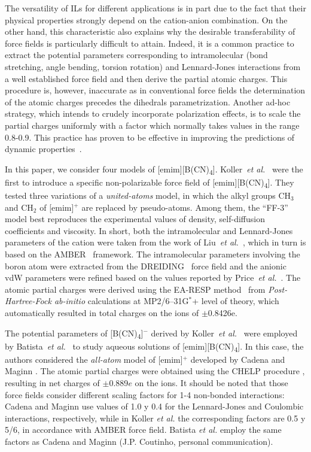 \documentclass[3p,twocolumn]{elsarticle}
\begin{document}
The versatility of ILs for different applications is in part due to the fact that their physical properties strongly depend on the cation-anion combination. On the other hand, this characteristic also explains why the desirable transferability of force fields is particularly difficult to attain. Indeed, it is a common practice to extract the potential parameters corresponding to intramolecular (bond stretching, angle bending, torsion rotation) and Lennard-Jones interactions from a well established force field and then derive the partial atomic charges. This procedure is, however, inaccurate as in conventional force fields the determination of the atomic charges precedes the dihedrals parametrization. Another ad-hoc strategy, which intends to crudely incorporate polarization effects, is to scale the partial charges uniformly with a factor which normally takes values in the range 0.8-0.9. This practice has proven to be effective in improving the predictions of dynamic properties~\cite{Schr_der_2012}.

In this paper, we consider four models of [emim][B(CN)\textsubscript{4}]. Koller~\textit{et al.}~\cite{Koller_2012} were the first to introduce a specific non-polarizable force field of [emim][B(CN)\textsubscript{4}]. They tested three variations of a \textit{united-atoms} model, in which the alkyl groups $\text{CH}_3$ and $\text{CH}_2$ of [emim]$^{+}$ are replaced by pseudo-atoms. Among them, the ``FF-3'' model best reproduces the experimental values of density, self-diffusion coefficients and viscosity. In short, both the intramolecular and Lennard-Jones parameters of the cation were taken from the work of Liu~\textit{et al.}~\cite{Liu_2006}, which in turn is based on the AMBER~\cite{Cornell_1995} framework. The intramolecular parameters involving the boron atom were extracted from the DREIDING~\cite{Mayo_1990} force field and the anionic vdW parameters were refined based on the values reported by Price~\textit{et al.}~\cite{Price_2001}. The atomic partial charges were derived using the EA-RESP method~\cite{Basma_2001} from \textit{Post-Hartree-Fock ab-initio} calculations at MP2/6–31G$^\ast$+ level of theory, which automatically resulted in total charges on the ions of $\pm$0.8426e. 

The potential parameters of [B(CN)\textsubscript{4}]$^{-}$ derived by Koller~\textit{et al.}~\cite{Koller_2012} were employed by Batista~\textit{et al.}~\cite{Batista_2015} to study aqueous solutions of [emim][B(CN)\textsubscript{4}]. In this case,  the authors considered the \textit{all-atom} model of [emim]$^{+}$ developed by Cadena and Maginn \cite{Cadena_2006}. The atomic partial charges were obtained using the CHELP procedure \cite{Breneman_1990}, resulting in net charges of $\pm$0.889$e$ on the ions. It should be noted that those force fields consider different scaling factors for 1-4 non-bonded interactions: Cadena and Maginn \cite{Cadena_2006} use values of 1.0 y 0.4 for the Lennard-Jones and Coulombic interactions, respectively, while in Koller \textit{et al.} \cite{Koller_2012} the corresponding factors are 0.5 y 5/6, in accordance with AMBER force field. Batista \textit{et al.} \cite{Batista_2015} employ the same factors as Cadena and Maginn \cite{Cadena_2006} (J.P. Coutinho, personal communication).
\end{document}

